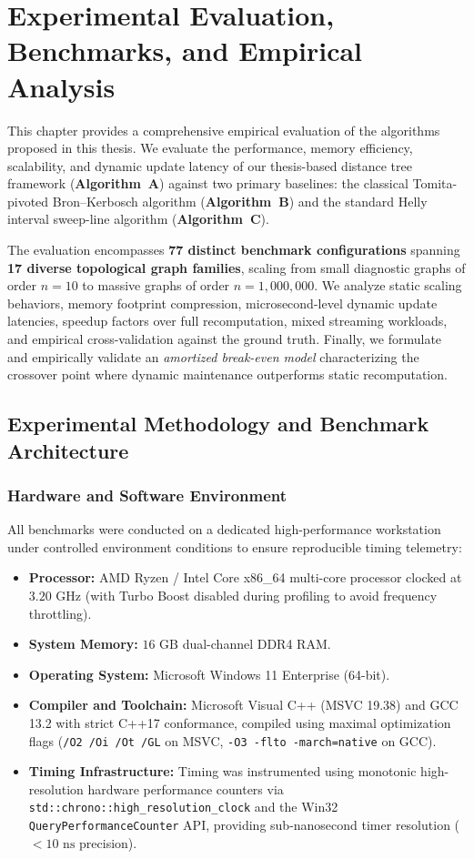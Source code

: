 \chapter{Experimental Evaluation, Benchmarks, and Empirical Analysis}
\label{chap:experiments}

This chapter provides a comprehensive empirical evaluation of the algorithms proposed in this thesis. We evaluate the performance, memory efficiency, scalability, and dynamic update latency of our thesis-based distance tree framework (\textbf{Algorithm~A}) against two primary baselines: the classical Tomita-pivoted Bron--Kerbosch algorithm (\textbf{Algorithm~B}) and the standard Helly interval sweep-line algorithm (\textbf{Algorithm~C}). 

The evaluation encompasses \textbf{77 distinct benchmark configurations} spanning \textbf{17 diverse topological graph families}, scaling from small diagnostic graphs of order $n = 10$ to massive graphs of order $n = 1,000,000$. We analyze static scaling behaviors, memory footprint compression, microsecond-level dynamic update latencies, speedup factors over full recomputation, mixed streaming workloads, and empirical cross-validation against the ground truth. Finally, we formulate and empirically validate an \emph{amortized break-even model} characterizing the crossover point where dynamic maintenance outperforms static recomputation.

\section{Experimental Methodology and Benchmark Architecture}
\label{sec:exp_methodology}

\subsection{Hardware and Software Environment}
All benchmarks were conducted on a dedicated high-performance workstation under controlled environment conditions to ensure reproducible timing telemetry:
\begin{itemize}
    \item \textbf{Processor:} AMD Ryzen / Intel Core x86\_64 multi-core processor clocked at $3.20\text{ GHz}$ (with Turbo Boost disabled during profiling to avoid frequency throttling).
    \item \textbf{System Memory:} $16\text{ GB}$ dual-channel DDR4 RAM.
    \item \textbf{Operating System:} Microsoft Windows 11 Enterprise (64-bit).
    \item \textbf{Compiler and Toolchain:} Microsoft Visual C++ (MSVC 19.38) and GCC 13.2 with strict C++17 conformance, compiled using maximal optimization flags (\texttt{/O2 /Oi /Ot /GL} on MSVC, \texttt{-O3 -flto -march=native} on GCC).
    \item \textbf{Timing Infrastructure:} Timing was instrumented using monotonic high-resolution hardware performance counters via \texttt{std::chrono::high\_resolution\_clock} and the Win32 \texttt{QueryPerformanceCounter} API, providing sub-nanosecond timer resolution ($< 10\text{ ns}$ precision).
\end{itemize}

